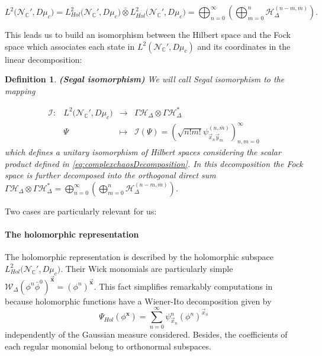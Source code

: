 \documentclass{elsarticle}%
\newtheorem{definition}{Definition}%
\begin{document}
     \begin{equation}
        \label{eq:holantiholdec}
        L^2\big({\mathcal{N}_{\mathbb{C}}'}, D\mu_c\big)=L^2_{Hol}\big({\mathcal{N}_{\mathbb{C}}'}, D\mu_c\big)\bar{\otimes} L^2_{\overline{Hol}}\big({\mathcal{N}_{\mathbb{C}}'}, D\mu_c\big)=\bigoplus _{n=0}^\infty\left( \bigoplus _{m=0}^n \mathcal{H}_\Delta^{(n-m,\bar{m})} \right).
    \end{equation}
    
    This leads us to build an isomorphism between the Hilbert space and the Fock space which associates each state in $L^2({\mathcal{N}_{\mathbb{C}}'}, D\mu_c)$ and its coordinates in the linear decomposition:

\begin{definition}
    \label{def:SegalIso}{\bf (Segal isomorphism)} 
    We will call Segal isomorphism to the mapping


    \begin{equation}
\label{eq:Segal}
\begin{array}{cccc}
    \mathcal{I} :&  L^2\big({\mathcal{N}_{\mathbb{C}}'}, D\mu_c\big) & \longrightarrow &  \Gamma\mathcal{H}_\Delta\otimes{\Gamma\mathcal{H}_\Delta^*}
 \\ 
 &  \Psi &\longmapsto &  \mathcal{I}(\Psi)=\left (\sqrt{n!m!}\psi^{(n,\bar{m})}_{\vec x_n \vec y_m} \right )_{n,m=0}^\infty 
\end{array}
\end{equation}
which defines a unitary isomorphism of Hilbert spaces considering the scalar product defined in \eqref{eq:complexchaosDecomposition}. In this decomposition the Fock space is further decomposed into the orthogonal direct sum $\Gamma\mathcal{H}_\Delta\otimes {\Gamma\mathcal{H}_\Delta^*}
=\bigoplus_{n=0}^\infty \left( \bigoplus_{m=0}^n \mathcal{H}_\Delta^{(n-m,\bar{m})} \right)$.
\end{definition} 

Two cases are particularly relevant for us:

\paragraph*{The holomorphic representation}
    The holomorphic representation is described by the holomorphic subspace $L^2_{Hol}\big({\mathcal{N}_{\mathbb{C}}'}, D\mu_c\big)$. Their Wick monomials are particularly simple $\mathcal{W}_\Delta(\phi^n\bar{\phi}^0)^{\vec{\mathbf{x}}}= (\phi^n)^{\vec{\mathbf{x}}}$. This fact simplifies remarkably computations in because holomorphic functions have a Wiener-Ito  decomposition given by 
    \begin{equation}
    \label{eq:holchaosdecomposition}
    \Psi_{Hol}(\phi^{\mathbf{x}})=\sum_{n=0}^\infty\psi^{n}_{\vec{x}_n}(\phi^n)^{\vec{x}_n}
    \end{equation}
     independently of the Gaussian measure considered. Besides, the coefficients of each regular monomial belong to orthonormal subspaces. 
\end{document}
